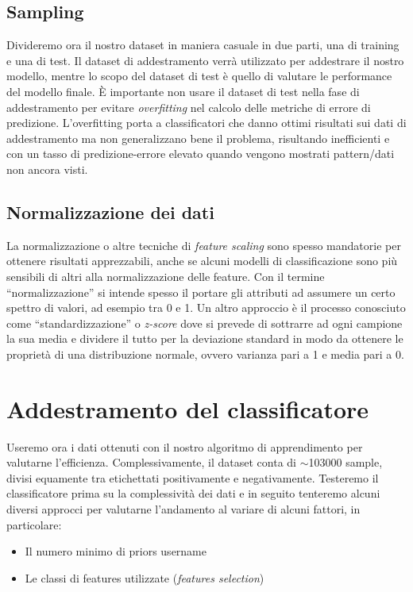 \subsection{Sampling}
Divideremo ora il nostro dataset in maniera casuale in due parti, una di training e una di test. Il dataset di addestramento verrà utilizzato per addestrare il nostro modello, mentre lo scopo del dataset di test è quello di valutare le performance del modello finale. È importante non usare il dataset di test nella fase di addestramento per evitare \textit{overfitting} nel calcolo delle metriche di errore di predizione. L'overfitting porta a classificatori che danno ottimi risultati sui dati di addestramento ma non generalizzano bene il problema, risultando inefficienti e con un tasso di predizione-errore elevato quando vengono mostrati pattern/dati non ancora visti.

\subsection{Normalizzazione dei dati}
La normalizzazione o altre tecniche di \textit{feature scaling} sono spesso mandatorie per ottenere risultati apprezzabili, anche se alcuni modelli di classificazione sono più sensibili di altri alla normalizzazione delle feature. Con il termine “normalizzazione” si intende spesso il portare gli attributi ad assumere un certo spettro di valori, ad esempio tra 0 e 1. Un altro approccio è il processo conosciuto come “standardizzazione” o \textit{z-score} dove si prevede di sottrarre ad ogni campione la sua media e dividere il tutto per la deviazione standard in modo da ottenere le proprietà di una distribuzione normale, ovvero varianza pari a 1 e media pari a 0.


\section{Addestramento del classificatore}
Useremo ora i dati ottenuti con il nostro algoritmo di apprendimento per valutarne l'efficienza. Complessivamente, il dataset conta di $\sim$103000 sample, divisi equamente tra etichettati positivamente e negativamente. Testeremo il classificatore prima su la complessività dei dati e in seguito tenteremo alcuni diversi approcci per valutarne l'andamento al variare di alcuni fattori, in particolare:

\begin{itemize}
	\item Il numero minimo di priors username
	\item Le classi di features utilizzate (\textit{features selection})
\end{itemize}


